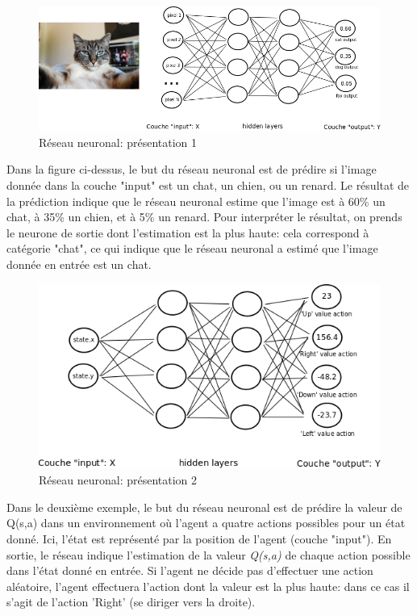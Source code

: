 \documentclass[11pt,a4paper]{report}
\begin{document}
    \begin{figure}[!h]
    \center
    \includegraphics[scale=0.56]{ressources/nn_presentation_1.png}
    \caption{Réseau neuronal: présentation 1}
    \end{figure} 
    
    \par Dans la figure ci-dessus, le but du réseau neuronal est de prédire si l'image donnée dans la couche "input" est un chat, un chien, ou un renard. Le résultat de la prédiction indique que le réseau neuronal estime que l'image est à 60\% un chat, à 35\% un chien, et à 5\% un renard. Pour interpréter le résultat, on prends le neurone de sortie dont l'estimation est la plus haute: cela correspond à catégorie "chat", ce qui indique que le réseau neuronal a estimé que l'image donnée en entrée est un chat. 
    
    \begin{figure}[!h]
    \center
    \includegraphics[scale=0.68]{ressources/nn_presentation_2.png}
    \caption{Réseau neuronal: présentation 2}
    \end{figure} 
    
    \par Dans le deuxième exemple, le but du réseau neuronal est de prédire la valeur de Q(s,a) dans un environnement où l'agent a quatre actions possibles pour un état donné. Ici, l'état est représenté par la position de l'agent (couche "input"). En sortie, le réseau indique l'estimation de la valeur \textit{Q(s,a)} de chaque action possible dans l'état donné en entrée. Si l'agent ne décide pas d'effectuer une action aléatoire, l'agent effectuera l'action dont la valeur est la plus haute: dans ce cas il s'agit de l'action 'Right' (se diriger vers la droite). 
    
\end{document}
